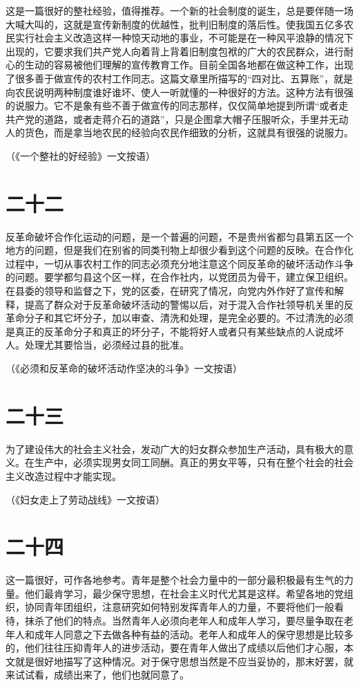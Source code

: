 这是一篇很好的整社经验，值得推荐。一个新的社会制度的诞生，总是要伴随一场大喊大叫的，这就是宣传新制度的优越性，批判旧制度的落后性。使我国五亿多农民实行社会主义改造这样一种惊天动地的事业，不可能是在一种风平浪静的情况下出现的，它要求我们共产党人向着背上背着旧制度包袱的广大的农民群众，进行耐心的生动的容易被他们理解的宣传教育工作。目前全国各地都在做这种工作，出现了很多善于做宣传的农村工作同志。这篇文章里所描写的“四对比、五算账”，就是向农民说明两种制度谁好谁坏、使人一听就懂的一种很好的方法。这种方法有很强的说服力。它不是象有些不善于做宣传的同志那样，仅仅简单地提到所谓“或者走共产党的道路，或者走蒋介石的道路”，只是企图拿大帽子压服听众，手里并无动人的货色，而是拿当地农民的经验向农民作细致的分析，这就具有很强的说服力。


（《一个整社的好经验》一文按语）

\section*{二十二}

反革命破坏合作化运动的问题，是一个普遍的问题，不是贵州省都匀县第五区一个地方的问题，但是我们在别省的同类刊物上却很少看到这个问题的反映。在合作化过程中，一切从事农村工作的同志必须充分地注意这个同反革命的破坏活动作斗争的问题。要学都匀县这个区一样，在合作社内，以党团员为骨干，建立保卫组织。在县委的领导和监督之下，党的区委，在研究了情况，向党内外作好了宣传和解释，提高了群众对于反革命破坏活动的警惕以后，对于混入合作社领导机关里的反革命分子和其它坏分子，加以审查、清洗和处理，是完全必要的。不过清洗的必须是真正的反革命分子和真正的坏分子，不能将好人或者只有某些缺点的人说成坏人。处理尤其要恰当，必须经过县的批准。


（《必须和反革命的破坏活动作坚决的斗争》一文按语）

\section*{二十三}

为了建设伟大的社会主义社会，发动广大的妇女群众参加生产活动，具有极大的意义。在生产中，必须实现男女同工同酬。真正的男女平等，只有在整个社会的社会主义改造过程中才能实现。


（《妇女走上了劳动战线》一文按语）

\section*{二十四}

这一篇很好，可作各地参考。青年是整个社会力量中的一部分最积极最有生气的力量。他们最肯学习，最少保守思想，在社会主义时代尤其是这样。希望各地的党组织，协同青年团组织，注意研究如何特别发挥青年人的力量，不要将他们一般看待，抹杀了他们的特点。当然青年人必须向老年人和成年人学习，要尽量争取在老年人和成年人同意之下去做各种有益的活动。老年人和成年人的保守思想是比较多的，他们往往压抑青年人的进步活动，要在青年人做出了成绩以后他们才心服，本文就是很好地描写了这种情况。对于保守思想当然是不应当妥协的，那末好罢，就来试试看，成绩出来了，他们也就同意了。


